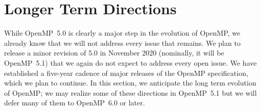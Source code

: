 \section{Longer Term Directions}
\label{sec:future_directions}

While OpenMP~5.0 is clearly a major step in the evolution of OpenMP,
we already know that we will not address every issue that remains.
We plan to release a minor revision of 5.0 in November 2020 (nominally,
it will be OpenMP~5.1) that we again do not expect to address every
open issue. We have established a five-year cadence of major releases 
of the OpenMP specification, which we plan to continue. In this section, 
we anticipate the long term evolution of OpenMP; we may realize some of 
these directions in OpenMP~5.1 but we will defer many of them to OpenMP~6.0 
or later. 










